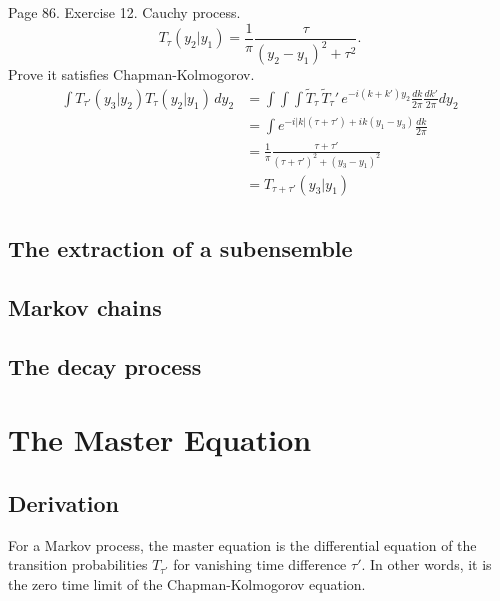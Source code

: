 \documentclass{book}
\numberwithin{equation}{section}
\theoremstyle{plain}
\theoremstyle{definition}
\theoremstyle{remark}
\begin{document}
Page 86.
Exercise 12.
Cauchy process.
\begin{equation}
  T_\tau(y_2|y_1)
  =
  \frac{1}{\pi}
  \frac{ \tau } { (y_2 - y_1)^2 + \tau^2 }.
\end{equation}
Prove it satisfies Chapman-Kolmogorov.
$$
\begin{aligned}
\int T_{\tau'}(y_3|y_2) T_\tau(y_2|y_1) \, dy_2
&=
\int \int \int \tilde T_\tau \, \tilde T_\tau' \,
e^{-i(k + k') y_2 } \frac{dk}{2\pi} \frac{dk'}{2\pi} dy_2
\\
&=
\int e^{ -i|k| (\tau +\tau') + ik (y_1 -y_3) } \frac{dk}{2\pi}
\\
&=
\frac{1}{\pi}
\frac{ \tau + \tau'}
{ (\tau + \tau')^2 + (y_3 - y_1)^2 } \\
&=
T_{\tau + \tau'}(y_3 | y_1) \\
\end{aligned}
$$



\section{The extraction of a subensemble}

\section{Markov chains}

\section{The decay process}


\chapter{The Master Equation}

\section{Derivation}

For a Markov process,
the master equation is the differential equation
of the transition probabilities $T_{\tau'}$
for vanishing time difference $\tau'$.
%
In other words,
it is the zero time limit of
the Chapman-Kolmogorov equation.
\end{document}
